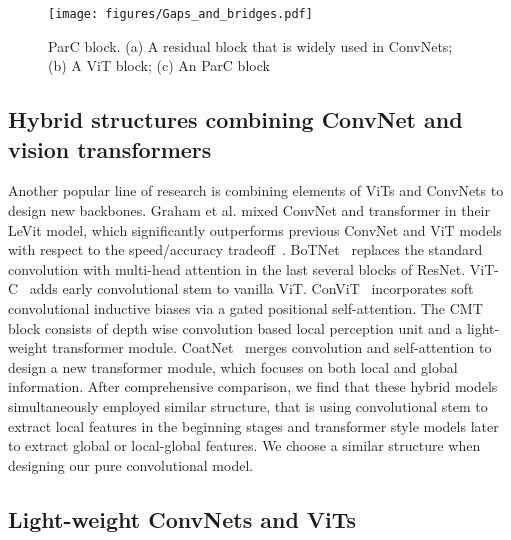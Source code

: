 \documentclass[10pt,twocolumn,letterpaper]{article}
\begin{document}
\begin{figure*}[t]
\centering
\texttt{[image: figures/Gaps\_and\_bridges.pdf]}
\vspace{-0.3cm}
\caption{ParC block. (a) A residual block that is widely used in ConvNets; (b) A ViT block; (c) An ParC block}
\vspace{-0.3cm}
\label{fig:ParC_block}
\end{figure*}

\subsection{Hybrid structures combining ConvNet and vision transformers}

Another popular line of research is combining elements of ViTs and ConvNets to design new backbones. Graham et al. mixed ConvNet and transformer in their LeVit model, which significantly outperforms previous ConvNet and ViT models with respect to the speed/accuracy tradeoff~\cite{graham2021levit}. BoTNet~\cite{srinivas2021bottleneck} replaces the standard convolution with multi-head attention in the last several blocks of ResNet. ViT-C~\cite{xiao2021early} adds early convolutional stem to vanilla ViT. ConViT~\cite{d2021convit} incorporates soft convolutional inductive biases via a gated positional self-attention. The CMT~\cite{guo2021cmt} block consists of depth wise convolution based local perception unit and a light-weight transformer module. CoatNet~\cite{dai2021coatnet} merges convolution and self-attention to design a new transformer module, which focuses on both local and global information. After comprehensive comparison, we find that these hybrid models simultaneously employed similar structure, that is using convolutional stem to extract local features in the beginning stages and transformer style models later to extract global or local-global features. We choose a similar structure when designing our pure convolutional model. 


\subsection{Light-weight ConvNets and ViTs}
\label{sec:light-weight}
\end{document}
